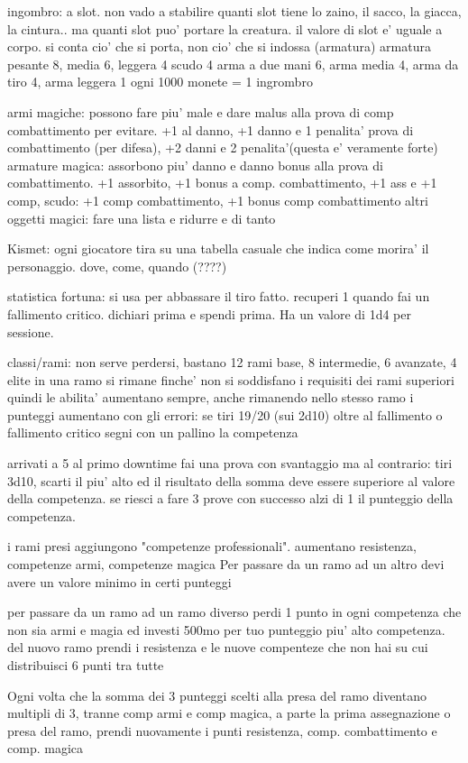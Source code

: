 \documentclass[12pt,a4paper,twoside,openany]{book}
\begin{document}
ingombro: a slot. non vado a stabilire quanti slot tiene lo zaino, il sacco, la giacca, la cintura.. ma quanti slot puo' portare la creatura. il valore di slot e' uguale a corpo. si conta cio' che si porta, non cio' che si indossa (armatura)
armatura pesante 8, media 6, leggera 4
scudo 4
arma a due mani 6, arma media 4, arma da tiro 4, arma leggera 1
ogni 1000 monete = 1 ingrombro

armi magiche: possono fare piu' male e dare malus alla prova di comp combattimento per evitare. +1 al danno, +1 danno e 1 penalita' prova di combattimento (per difesa), +2 danni e 2 penalita'(questa e' veramente forte)
armature magica: assorbono piu' danno e danno bonus alla prova di combattimento. +1 assorbito, +1 bonus a comp. combattimento, +1 ass e +1 comp, 
scudo: +1 comp combattimento, +1 bonus comp combattimento
altri oggetti magici: fare una lista e ridurre e di tanto

Kismet: ogni giocatore tira su una tabella casuale che indica come morira' il personaggio. dove, come, quando (????)

statistica fortuna: si usa per abbassare il tiro fatto. recuperi 1 quando fai un fallimento critico. dichiari prima e spendi prima.
Ha un valore di 1d4 per sessione.

classi/rami: non serve perdersi, bastano 12 rami base, 8 intermedie, 6 avanzate, 4 elite
in una ramo si rimane finche' non si soddisfano i requisiti dei rami superiori
quindi le abilita' aumentano sempre, anche rimanendo nello stesso ramo
i punteggi aumentano con gli errori: se tiri 19/20 (sui 2d10) oltre al fallimento o fallimento critico segni con un pallino la competenza

arrivati a 5 al primo downtime fai una prova con svantaggio ma al contrario: tiri 3d10, scarti il piu' alto ed il risultato della somma deve essere superiore al valore della competenza. se riesci a fare 3 prove con successo alzi di 1 il punteggio della competenza.

i rami presi aggiungono "competenze professionali". aumentano resistenza, competenze armi, competenze magica Per passare da un ramo ad un altro devi avere un valore minimo in certi punteggi

per passare da un ramo ad un ramo diverso perdi 1 punto in ogni competenza che non sia armi e magia ed investi 500mo per tuo punteggio piu' alto competenza. del nuovo ramo prendi i resistenza e le nuove compenteze che non hai su cui distribuisci 6 punti tra tutte

Ogni volta che la somma dei 3 punteggi scelti alla presa del ramo diventano multipli di 3, tranne comp armi e comp magica, a parte la prima assegnazione o presa del ramo, prendi nuovamente i punti resistenza, comp. combattimento e comp. magica
\end{document}
